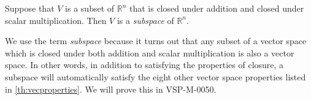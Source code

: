 \documentclass{ximera}
\newcommand{\RR}{\mathbb{R}}
\newcommand{\dfn}{\textit}
\begin{document}


\begin{definition}\label{def:subspace} Suppose that $V$ is a subset of $\RR^n$ that is closed under addition and closed under scalar multiplication.  Then $V$ is a \dfn{subspace} of $\RR^n$.
\end{definition}
We use the term \dfn{subspace} because it turns out that any subset of a vector space which is closed under both addition and scalar multiplication is also a vector space.  In other words, in addition to satisfying the properties of closure, a subspace will automatically satisfy the eight other vector space properties listed in \ref{th:vecproperties}.  We will prove this in VSP-M-0050.
\end{document}
